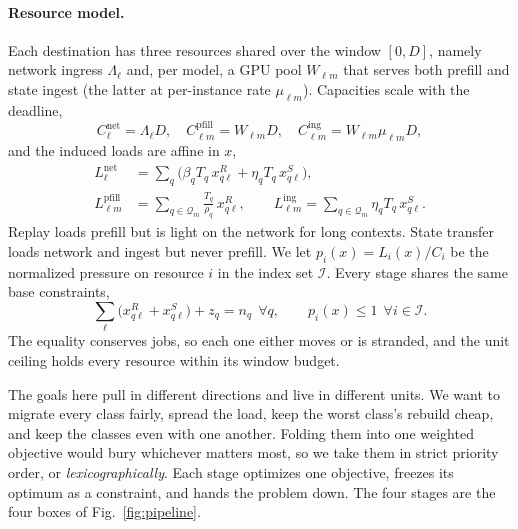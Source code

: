 \paragraph{Resource model.} Each destination has three resources shared over the
window $[0,D]$, namely network ingress $\Lambda_\ell$ and, per model, a GPU
pool $W_{\ell m}$ that serves both prefill and state ingest (the latter at
per-instance rate $\mu_{\ell m}$). Capacities scale with the deadline,
\[
C^{\mathrm{net}}_\ell=\Lambda_\ell D,\quad
C^{\mathrm{pfill}}_{\ell m}=W_{\ell m} D,\quad
C^{\mathrm{ing}}_{\ell m}=W_{\ell m}\mu_{\ell m} D,
\]
and the induced loads are affine in $x$,
\[
\begin{aligned}
L^{\mathrm{net}}_\ell &= \textstyle\sum_q\big(\beta_q T_q\,x^R_{q\ell}+\eta_q T_q\,x^S_{q\ell}\big),\\
L^{\mathrm{pfill}}_{\ell m} &= \textstyle\sum_{q\in\mathcal{Q}_m}\tfrac{T_q}{\rho_q}\,x^R_{q\ell},
\qquad
L^{\mathrm{ing}}_{\ell m} = \textstyle\sum_{q\in\mathcal{Q}_m}\eta_q T_q\,x^S_{q\ell}.
\end{aligned}
\]
Replay loads prefill but is light on the network for long contexts. State transfer
loads network and ingest but never prefill. We let $p_i(x)=L_i(x)/C_i$ be the
normalized pressure on resource $i$ in the index set $\mathcal{I}$. Every stage
shares the same base constraints,
\[
\sum_{\ell}\big(x^R_{q\ell}+x^S_{q\ell}\big)+z_q=n_q\ \ \forall q,
\qquad
p_i(x)\le 1\ \ \forall i\in\mathcal{I}.
\]
The equality conserves jobs, so each one either moves or is stranded, and the unit
ceiling holds every resource within its window budget.

The goals here pull in different directions and live in different units. We want to
migrate every class fairly, spread the load, keep the worst class's rebuild cheap,
and keep the classes even with one another. Folding them into one weighted objective
would bury whichever matters most, so we take them in strict priority order, or
\emph{lexicographically}. Each stage optimizes one objective, freezes its optimum
as a constraint, and hands the problem down. The four stages are the four boxes of
Fig.~\ref{fig:pipeline}.

